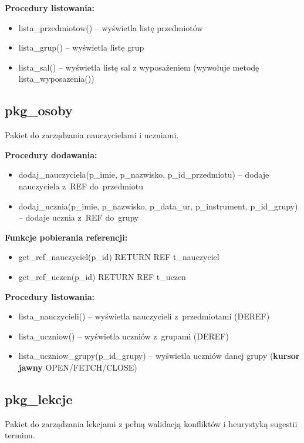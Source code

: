 \documentclass[12pt,a4paper]{article}
\begin{document}
\textbf{Procedury listowania:}
\begin{itemize}[nosep]
    \item lista\_przedmiotow() -- wyświetla listę przedmiotów
    \item lista\_grup() -- wyświetla listę grup
    \item lista\_sal() -- wyświetla listę sal z wyposażeniem (wywołuje metodę lista\_wyposazenia())
\end{itemize}

\subsection{pkg\_osoby}

Pakiet do zarządzania nauczycielami i uczniami.

\textbf{Procedury dodawania:}
\begin{itemize}[nosep]
    \item dodaj\_nauczyciela(p\_imie, p\_nazwisko, p\_id\_przedmiotu) -- dodaje nauczyciela z~REF do~przedmiotu
    \item dodaj\_ucznia(p\_imie, p\_nazwisko, p\_data\_ur, p\_instrument, p\_id\_grupy) -- dodaje ucznia z~REF do~grupy
\end{itemize}

\textbf{Funkcje pobierania referencji:}
\begin{itemize}[nosep]
    \item get\_ref\_nauczyciel(p\_id) RETURN REF t\_nauczyciel
    \item get\_ref\_uczen(p\_id) RETURN REF t\_uczen
\end{itemize}

\textbf{Procedury listowania:}
\begin{itemize}[nosep]
    \item lista\_nauczycieli() -- wyświetla nauczycieli z~przedmiotami (DEREF)
    \item lista\_uczniow() -- wyświetla uczniów z~grupami (DEREF)
    \item lista\_uczniow\_grupy(p\_id\_grupy) -- wyświetla uczniów danej grupy (\textbf{kursor jawny} OPEN/FETCH/CLOSE)
\end{itemize}

\subsection{pkg\_lekcje}

Pakiet do zarządzania lekcjami z pełną walidacją konfliktów i heurystyką sugestii terminu.
\end{document}
